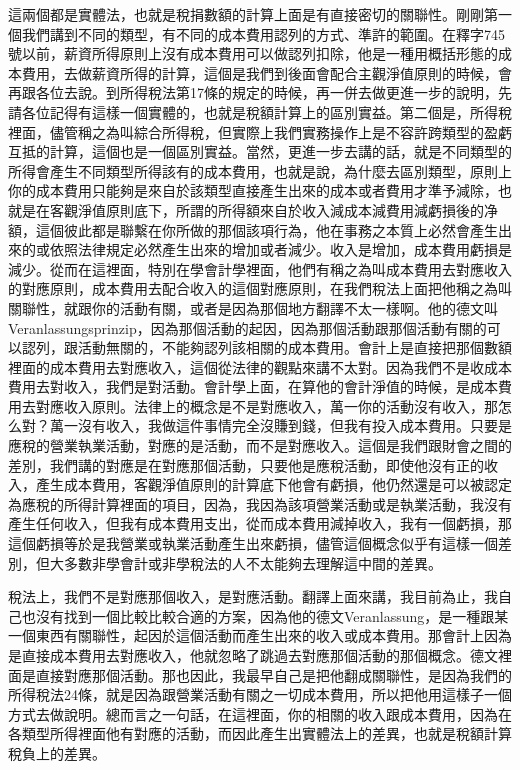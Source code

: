 \documentclass[oneside,sub3section]{ctexbook}
\begin{document}
這兩個都是實體法，也就是稅捐數額的計算上面是有直接密切的關聯性。剛剛第一個我們講到不同的類型，有不同的成本費用認列的方式、準許的範圍。在釋字745號以前，薪資所得原則上沒有成本費用可以做認列扣除，他是一種用概括形態的成本費用，去做薪資所得的計算，這個是我們到後面會配合主觀淨值原則的時候，會再跟各位去說。到所得稅法第17條的規定的時候，再一併去做更進一步的說明，先請各位記得有這樣一個實體的，也就是稅額計算上的區別實益。第二個是，所得稅裡面，儘管稱之為叫綜合所得稅，但實際上我們實務操作上是不容許跨類型的盈虧互抵的計算，這個也是一個區別實益。當然，更進一步去講的話，就是不同類型的所得會產生不同類型所得該有的成本費用，也就是說，為什麼去區別類型，原則上你的成本費用只能夠是來自於該類型直接產生出來的成本或者費用才準予減除，也就是在客觀淨值原則底下，所謂的所得額來自於收入減成本減費用減虧損後的净額，這個彼此都是聯繫在你所做的那個該項行為，他在事務之本質上必然會產生出來的或依照法律規定必然產生出來的增加或者減少。收入是增加，成本費用虧損是減少。從而在這裡面，特別在學會計學裡面，他們有稱之為叫成本費用去對應收入的對應原則，成本費用去配合收入的這個對應原則，在我們稅法上面把他稱之為叫關聯性，就跟你的活動有關，或者是因為那個地方翻譯不太一樣啊。他的德文叫Veranlassungsprinzip，因為那個活動的起因，因為那個活動跟那個活動有關的可以認列，跟活動無關的，不能夠認列該相關的成本費用。會計上是直接把那個數額裡面的成本費用去對應收入，這個從法律的觀點來講不太對。因為我們不是收成本費用去對收入，我們是對活動。會計學上面，在算他的會計淨值的時候，是成本費用去對應收入原則。法律上的概念是不是對應收入，萬一你的活動沒有收入，那怎么對？萬一沒有收入，我做這件事情完全沒賺到錢，但我有投入成本費用。只要是應稅的營業執業活動，對應的是活動，而不是對應收入。這個是我們跟財會之間的差別，我們講的對應是在對應那個活動，只要他是應稅活動，即使他沒有正的收入，產生成本費用，客觀淨值原則的計算底下他會有虧損，他仍然還是可以被認定為應稅的所得計算裡面的項目，因為，我因為該項營業活動或是執業活動，我沒有產生任何收入，但我有成本費用支出，從而成本費用減掉收入，我有一個虧損，那這個虧損等於是我營業或執業活動產生出來虧損，儘管這個概念似乎有這樣一個差別，但大多數非學會計或非學稅法的人不太能夠去理解這中間的差異。

稅法上，我們不是對應那個收入，是對應活動。翻譯上面來講，我目前為止，我自己也沒有找到一個比較比較合適的方案，因為他的德文Veranlassung，是一種跟某一個東西有關聯性，起因於這個活動而產生出來的收入或成本費用。那會計上因為是直接成本費用去對應收入，他就忽略了跳過去對應那個活動的那個概念。德文裡面是直接對應那個活動。那也因此，我最早自己是把他翻成關聯性，是因為我們的所得稅法24條，就是因為跟營業活動有關之一切成本費用，所以把他用這樣子一個方式去做說明。總而言之一句話，在這裡面，你的相關的收入跟成本費用，因為在各類型所得裡面他有對應的活動，而因此產生出實體法上的差異，也就是稅額計算稅負上的差異。
\end{document}
